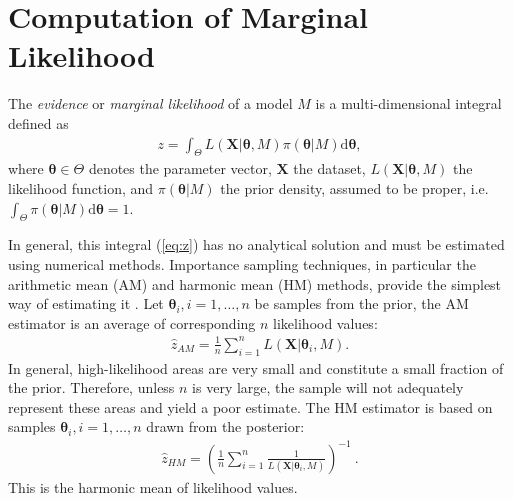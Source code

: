 \documentclass[aps,reprint,amsmath,amssymb,showpacs,showkeys]{revtex4-1}%
\begin{document}
\section{Computation of Marginal Likelihood}

The \textit{evidence} or \textit{marginal likelihood} of a model  $M$ is a multi-dimensional integral defined as
\begin{align}
\label{eq:z}
z = \int_{\Theta}L(\bm{X}|\bm{\theta},M)\pi(\bm{\theta}|M) \text{d} \bm{\theta},
\end{align}
where $\bm{\theta} \in \Theta$ denotes the parameter vector, $\bm{X}$ the dataset, $L(\bm{X}|\bm{\theta},M)$  the likelihood function, and $\pi(\bm{\theta}|M)$  the prior density, assumed to be proper, i.e.\ $ \int_{\Theta}\pi(\bm{\theta}|M) \text{d} \bm{\theta}=1$.

In general, this integral (\ref{eq:z}) has no analytical solution and must be estimated using numerical methods.  Importance sampling techniques, in particular the arithmetic mean (AM) and harmonic mean (HM) methods,  provide the simplest way of estimating it \citep{Newton:Raftery:1994}.
Let $\bm{\theta}_i, i=1,\ldots,n$ be samples from the prior, the AM estimator is an average of corresponding $n$ likelihood values:
\begin{align}
\label{eq:AM}
\widehat{z}_{AM} = \frac{1}{n}\sum_{i=1}^n L(\bm{X}|\bm{\theta}_i,M).
\end{align}
In general, high-likelihood areas are very small and  constitute a small fraction of the prior.  Therefore, unless $n$ is very large, the sample will not adequately represent these areas and yield a poor estimate.  The HM estimator is  based on samples 
$\bm{\theta}_i, i=1,\ldots,n$
 drawn from the posterior:
\begin{align}
\label{eq:HM}
\widehat{z}_{HM} = \left( \frac{1}{n}\sum_{i=1}^n \frac{1}{ L(\bm{X}|\bm{\theta}_i,M)} \right)^{-1} ~ .
\end{align}
This is the harmonic mean of likelihood values.
\end{document}
